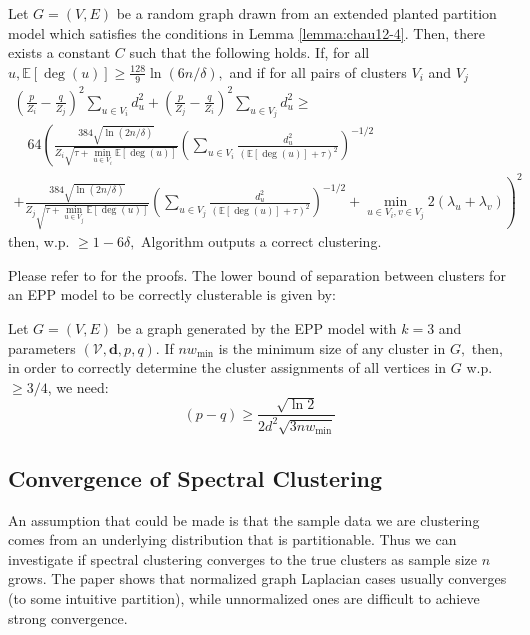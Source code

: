 {	\begin{theorem}
		Let $G=(V, E)$ be a random graph drawn from an extended planted partition model which satisfies the conditions in Lemma \ref{lemma:chau12-4}. Then, there exists a constant $C$ such that the following holds. If, for all $u, \mathbb{E}[\operatorname{deg}(u)] \geq \frac{128}{9} \ln (6 n / \delta),$ and if for all pairs of clusters $V_{i}$ and $V_{j}$
		$$
		\begin{array}{c}
		\left(\frac{p}{Z_{i}}-\frac{q}{Z_{j}}\right)^{2} \sum_{u \in V_{i}} d_{u}^{2}+\left(\frac{p}{Z_{j}}-\frac{q}{Z_{i}}\right)^{2} \sum_{u \in V_{j}} d_{u}^{2} \geq \\
		\quad 64\left(\frac{384 \sqrt{\ln (2 n / \delta)}}{Z_{i} \sqrt{\tau+\min _{u \in V_{i}} \mathbb{E}[\operatorname{deg}(u)]}}\left(\sum_{u \in V_{i}} \frac{d_{u}^{2}}{(\mathbb{E}[\operatorname{deg}(u)]+\tau)^{2}}\right)^{-1 / 2}\right. \\
		\left.+\frac{384 \sqrt{\ln (2 n / \delta)}}{Z_{j} \sqrt{\tau+\min _{u \in V_{j}} \mathbb{E}[\operatorname{deg}(u)]}}\left(\sum_{u \in V_{j}} \frac{d_{u}^{2}}{(\mathbb{E}[\operatorname{deg}(u)]+\tau)^{2}}\right)^{-1 / 2}+\min _{u \in V_{i}, v \in V_{j}} 2\left(\lambda_{u}+\lambda_{v}\right)\right)^{2}
		\end{array}
		$$
		then, w.p. $\geq 1-6 \delta,$ Algorithm outputs a correct clustering.
	\end{theorem}
	
	Please refer to \cite{chau12} for the proofs. The lower bound of separation between clusters for an EPP model to be correctly clusterable is given by:
	
	\begin{theorem}
		Let $G=(V, E)$ be a graph generated by the EPP model with $k=3$ and parameters $(\mathcal{V}, \boldsymbol{d}, p, q) .$ If $n w_{\min }$ is the minimum size of any cluster in $G,$ then, in order to correctly determine the cluster assignments of all vertices in $G$ w.p. $\geq 3 / 4$, we need:
		$$
		(p-q) \geq \frac{\sqrt{\ln 2}}{2 d^{2} \sqrt{3 n w_{\min }}}
		$$
	\end{theorem}
	
	\subsection{Convergence of Spectral Clustering}
	
	An assumption that could be made is that the sample data we are clustering comes from an underlying distribution that is partitionable. Thus we can investigate if spectral clustering converges to the true clusters as sample size $n$ grows. The paper \cite{vlux04} shows that normalized graph Laplacian cases usually converges (to some intuitive partition), while unnormalized ones are difficult to achieve strong convergence.
	
}
